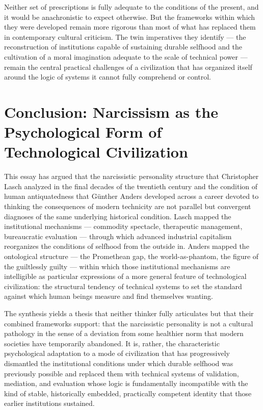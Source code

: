 \documentclass[12pt]{memoir}
\begin{document}
Neither set of prescriptions is fully adequate to the conditions of the present, and it would
be anachronistic to expect otherwise. But the frameworks within which they were developed
remain more rigorous than most of what has replaced them in contemporary cultural criticism.
The twin imperatives they identify — the reconstruction of institutions capable of sustaining
durable selfhood and the cultivation of a moral imagination adequate to the scale of technical
power — remain the central practical challenges of a civilization that has organized itself
around the logic of systems it cannot fully comprehend or control.

\section{Conclusion: Narcissism as the Psychological Form of Technological Civilization}
\label{sec:conclusion}

This essay has argued that the narcissistic personality structure that Christopher Lasch
analyzed in the final decades of the twentieth century and the condition of human antiquatedness
that Günther Anders developed across a career devoted to thinking the consequences of modern
technicity are not parallel but convergent diagnoses of the same underlying historical
condition. Lasch mapped the institutional mechanisms — commodity spectacle, therapeutic
management, bureaucratic evaluation — through which advanced industrial capitalism reorganizes
the conditions of selfhood from the outside in. Anders mapped the ontological structure — the
Promethean gap, the world-as-phantom, the figure of the guiltlessly guilty — within which
those institutional mechanisms are intelligible as particular expressions of a more general
feature of technological civilization: the structural tendency of technical systems to set the
standard against which human beings measure and find themselves wanting.

The synthesis yields a thesis that neither thinker fully articulates but that their combined
frameworks support: that the narcissistic personality is not a cultural pathology in the sense
of a deviation from some healthier norm that modern societies have temporarily abandoned. It
is, rather, the characteristic psychological adaptation to a mode of civilization that has
progressively dismantled the institutional conditions under which durable selfhood was
previously possible and replaced them with technical systems of validation, mediation, and
evaluation whose logic is fundamentally incompatible with the kind of stable, historically
embedded, practically competent identity that those earlier institutions sustained.
\end{document}
